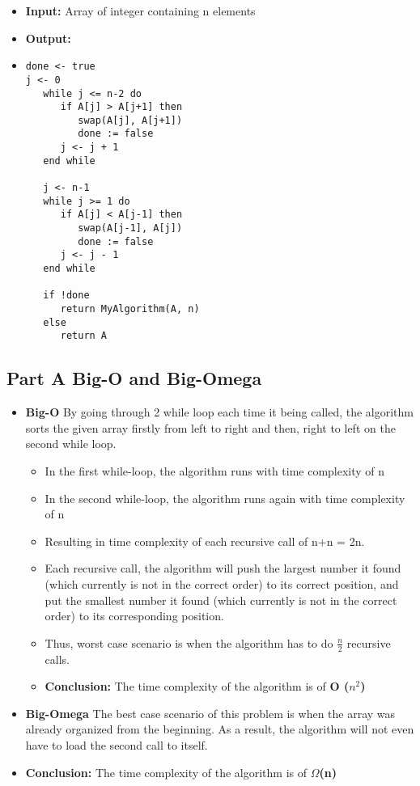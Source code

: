 \documentclass{article}
\begin{document}
\begin{itemize}
	\item[]\textbf{Input: } Array of integer containing n elements 
	\item[]\textbf{Output: } 
\item[]\begin{verbatim}
done <- true
j <- 0
   while j <= n-2 do
      if A[j] > A[j+1] then
         swap(A[j], A[j+1])
         done := false
      j <- j + 1
   end while

   j <- n-1
   while j >= 1 do 
      if A[j] < A[j-1] then 
         swap(A[j-1], A[j])
         done := false
      j <- j - 1
   end while

   if !done 
      return MyAlgorithm(A, n)
   else
      return A
\end{verbatim}

\end{itemize}

\subsection*{Part A\: Big-O and Big-Omega }
\begin{itemize}
\item[]\textbf{Big-O} By going through 2 while loop each time it being called, the algorithm sorts the given array firstly from left to right and then, right to left on the second while loop. 
\begin{itemize}
	\item In the first while-loop, the algorithm runs with time complexity of n
	\item In the second while-loop, the algorithm runs again with time complexity of n
	\item Resulting in time complexity of each recursive call of n+n = 2n. 
	\item Each recursive call, the algorithm will push the largest number it found (which currently is not in the correct order) to its correct position, and put the smallest number it found (which currently is not in the correct order) to its corresponding position.
	\item Thus, worst case scenario is when the algorithm has to do $\frac{n}{2}$ recursive calls.
	\item\textbf{Conclusion: } The time complexity of the algorithm is of \textbf{O ($n^2$)}
\end{itemize}

\item[]\textbf{Big-Omega } The best case scenario of this problem is when the array was already organized from the beginning. As a result, the algorithm will not even have to load the second call to itself.
\item[] \textbf{Conclusion: } The time complexity of the algorithm is of $\Omega$\textbf{(n)}

\end{itemize}
\end{document}
